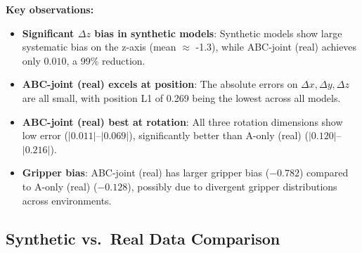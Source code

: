 \documentclass[10pt,twocolumn]{article}
\begin{document}
\begin{table}[H]
\centering
\caption{Per-dimension error mean values (signed).}
\label{tab:perdim}
\end{table}

\textbf{Key observations:}
\begin{itemize}[nosep]
    \item \textbf{Significant $\Delta z$ bias in synthetic models}: Synthetic models show large systematic bias on the z-axis (mean $\approx$ -1.3), while ABC-joint (real) achieves only $0.010$, a 99\% reduction.
    \item \textbf{ABC-joint (real) excels at position}: The absolute errors on $\Delta x, \Delta y, \Delta z$ are all small, with position L1 of 0.269 being the lowest across all models.
    \item \textbf{ABC-joint (real) best at rotation}: All three rotation dimensions show low error ($|0.011|$--$|0.069|$), significantly better than A-only (real) ($|0.120|$--$|0.216|$).
    \item \textbf{Gripper bias}: ABC-joint (real) has larger gripper bias ($-0.782$) compared to A-only (real) ($-0.128$), possibly due to divergent gripper distributions across environments.
\end{itemize}

\subsection{Synthetic vs.\ Real Data Comparison}
\end{document}
